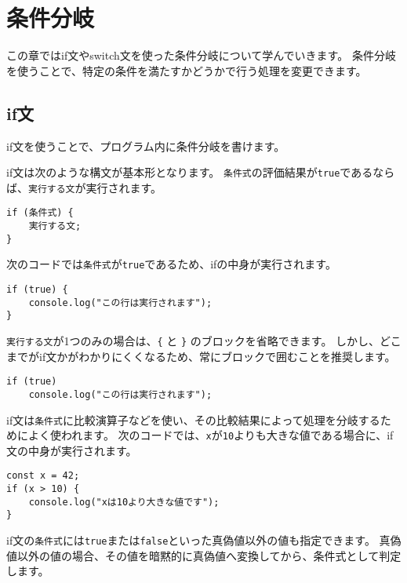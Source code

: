 \hypertarget{conditional-branch}{%
\chapter{条件分岐}\label{conditional-branch}}
\thispagestyle{frontheadings}

この章ではif文やswitch文を使った条件分岐について学んでいきます。
条件分岐を使うことで、特定の条件を満たすかどうかで行う処理を変更できます。

\hypertarget{if-statement}{%
\section{if文}\label{if-statement}}

if文を使うことで、プログラム内に条件分岐を書けます。

if文は次のような構文が基本形となります。
\texttt{条件式}の評価結果が\texttt{true}であるならば、\texttt{実行する文}が実行されます。

\begin{lstlisting}
if (条件式) {
    実行する文;
}
\end{lstlisting}

次のコードでは\texttt{条件式}が\texttt{true}であるため、ifの中身が実行されます。

\begin{lstlisting}
if (true) {
    console.log("この行は実行されます");
}
\end{lstlisting}

\texttt{実行する文}が1つのみの場合は、\texttt{\{}
と \texttt{\}} のブロックを省略できます。
しかし、どこまでがif文かがわかりにくくなるため、常にブロックで囲むことを推奨します。

\begin{lstlisting}
if (true)
    console.log("この行は実行されます");
\end{lstlisting}

if文は\texttt{条件式}に比較演算子などを使い、その比較結果によって処理を分岐するためによく使われます。
次のコードでは、\texttt{x}が\texttt{10}よりも大きな値である場合に、if文の中身が実行されます。\enlargethispage{\baselineskip}

\begin{lstlisting}
const x = 42;
if (x > 10) {
    console.log("xは10より大きな値です");
}
\end{lstlisting}

if文の\texttt{条件式}には\texttt{true}または\texttt{false}といった真偽値以外の値も指定できます。
真偽値以外の値の場合、その値を暗黙的に真偽値へ変換してから、条件式として判定します。

